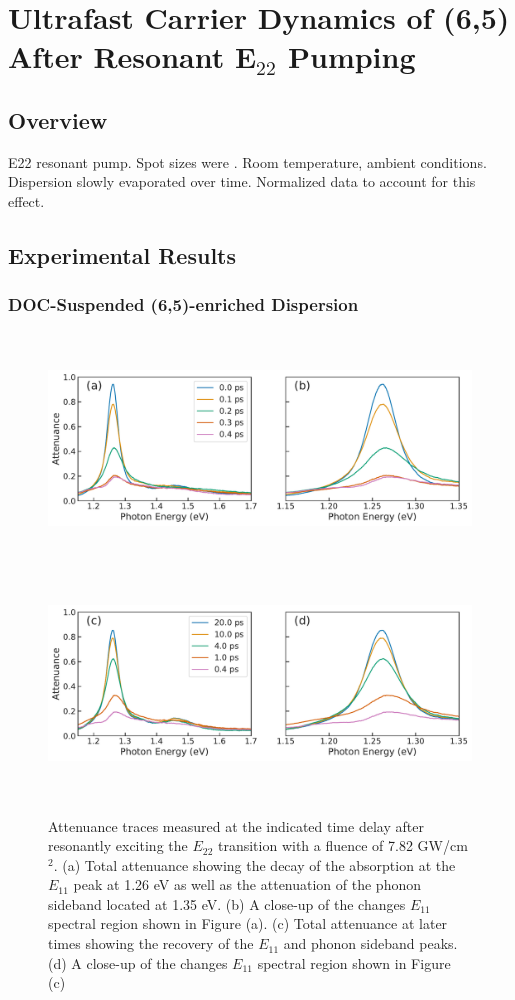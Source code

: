 \chapter{Ultrafast Carrier Dynamics of (6,5) After Resonant E$_{22}$ Pumping}

\section{Overview}

E22 resonant pump. Spot sizes were . Room temperature, ambient conditions. Dispersion slowly evaporated over time. Normalized data to account for this effect.

\section{Experimental Results}

\subsection{DOC-Suspended (6,5)-enriched Dispersion}

\begin{figure}[H]
	\centering
	{\includegraphics[height=2.4in]{images/chapter_my_data/Weilu_CNT_4mW_E11_decay} }
	{\includegraphics[height=2.4in]{images/chapter_my_data/Weilu_CNT_4mW_E11_recovery} }
	\caption{Attenuance traces measured at the indicated time delay after resonantly exciting the $E_{22}$ transition with a fluence of 7.82 GW/cm$^2$. (a) Total attenuance showing the decay of the absorption at the $E_{11}$ peak at 1.26 eV as well as the attenuation of the phonon sideband located at 1.35 eV. (b) A close-up of the changes $E_{11}$ spectral region shown in Figure (a). (c) Total attenuance at later times showing the recovery of the $E_{11}$ and phonon sideband peaks. (d) A close-up of the changes $E_{11}$ spectral region shown in Figure (c)}
\end{figure}

